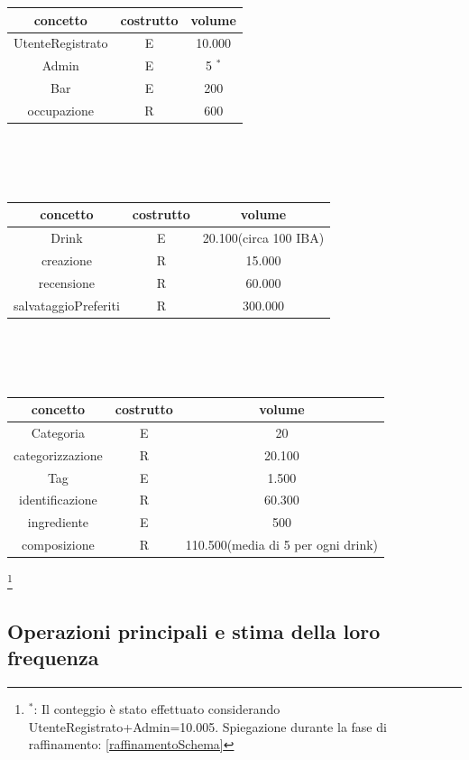 \documentclass[a4paper,12pt]{report}
\begin{document}
\renewcommand{\arraystretch}{1.3} 
\begin{tabular}{c|c|c}
    concetto & costrutto & volume\\
\hline
    \small UtenteRegistrato\normalsize & E & 10.000\\
    \hline
    Admin & E & 5 $^*$ \\
    \hline
    Bar & E & 200\\
    \hline
    occupazione & R & 600\\
\hline
\end{tabular}
\\
\\
\\
\renewcommand{\arraystretch}{1.3} 
\begin{tabular}{c|c|c}
    concetto & costrutto & volume\\
\hline
    Drink & E & 20.100\tiny(circa 100 IBA)\normalsize\\
    \hline
    creazione & R & 15.000\\
    \hline
    recensione & R & 60.000\\
    \hline
    \footnotesize salvataggioPreferiti\normalsize & R & 300.000\\
\hline
\end{tabular}
\\
\\
\\
\renewcommand{\arraystretch}{1.3} 
\begin{tabular}{c|c|c}
    concetto & costrutto & volume\\
\hline
    Categoria & E & 20\\
    \hline
    categorizzazione & R & 20.100\\
    \hline
    Tag & E & 1.500\\
    \hline
    identificazione & R & 60.300\\
    \hline
    ingrediente & E & 500\\
    \hline
    composizione & R & 110.500\tiny(media di 5 per ogni drink)\\
\hline
\end{tabular}

\footnote{$^*$: Il conteggio è stato effettuato considerando UtenteRegistrato+Admin=10.005. Spiegazione durante la fase di raffinamento: \ref{raffinamentoSchema}}

\newpage
\subsection{Operazioni principali e stima della loro frequenza}
\end{document}
